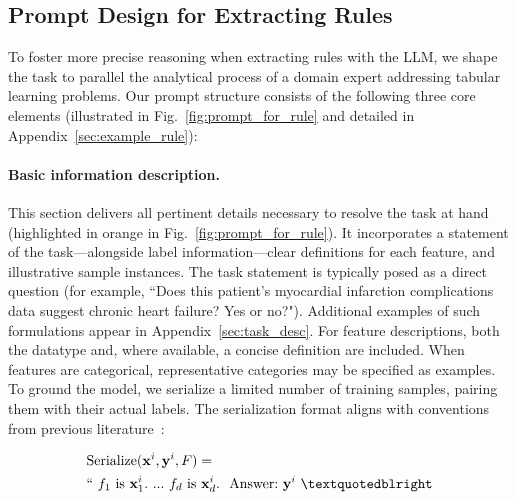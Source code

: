 \subsection{Prompt Design for Extracting Rules}
\label{Sec:prompt_design}
To foster more precise reasoning when extracting rules with the LLM, we shape the task to parallel the analytical process of a domain expert addressing tabular learning problems. Our prompt structure consists of the following three core elements (illustrated in Fig.~\ref{fig:prompt_for_rule} and detailed in Appendix~\ref{sec:example_rule}):

\vspace*{-0.12in}
\paragraph{Basic information description.} This section delivers all pertinent details necessary to resolve the task at hand (highlighted in orange in Fig.~\ref{fig:prompt_for_rule}). It incorporates a statement of the task—alongside label information—clear definitions for each feature, and illustrative sample instances. The task statement is typically posed as a direct question (for example, ``Does this patient's myocardial infarction complications data suggest chronic heart failure? Yes or no?"). Additional examples of such formulations appear in Appendix~\ref{sec:task_desc}. For feature descriptions, both the datatype and, where available, a concise definition are included. When features are categorical, representative categories may be specified as examples. To ground the model, we serialize a limited number of training samples, pairing them with their actual labels. The serialization format aligns with conventions from previous literature~\cite{dinh2022lift,hegselmann2023tabllm}:

\begin{align}
&\text{Serialize}(\mathbf{x}^i,\mathbf{y}^i, F) = \nonumber \\ 
&``\ f_1\ \text{is}\ \mathbf{x}^i_1.\ ... \ f_d\  \text{is}\  \mathbf{x}^i_d.\ \ \text{Answer:}\  \mathbf{y}^i\ ”
\end{align}

\vspace*{-0.12in}
